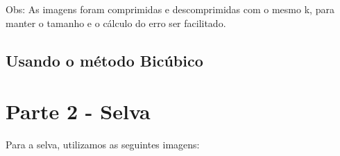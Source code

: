 \documentclass[12pt,letterpaper]{article}
\begin{document}
	\begin{figure}[h]
	\end{figure}
	
	Obs: As imagens foram comprimidas e descomprimidas com o mesmo k, para manter o tamanho e o cálculo do erro ser facilitado.
	
	\subsection{Usando o método Bicúbico}
	
	\section{Parte 2 - Selva}
	
	Para a selva, utilizamos as seguintes imagens:
	\clearpage
	
\end{document}
